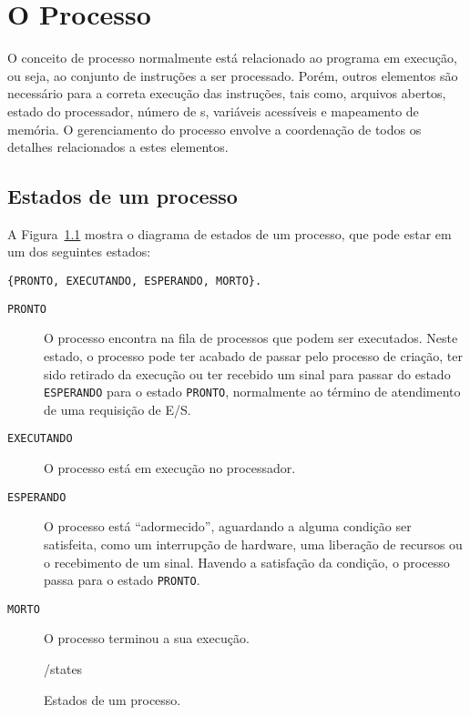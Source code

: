 
\chapter{O Processo}

O conceito de processo normalmente está relacionado ao programa em
execução, ou seja, ao conjunto de instruções a ser processado. Porém,
outros elementos são necessário para a correta execução das
instruções, tais como, arquivos abertos, estado do processador, número
de \thread{}s, variáveis acessíveis e mapeamento de memória. O
gerenciamento do processo envolve a coordenação de todos os detalhes
relacionados a estes elementos.

\section{Estados de um processo}

A Figura~\ref{fig:proc:states} mostra o diagrama de estados de um
processo, que pode estar em um dos seguintes estados:

\begin{center}
  {\tt\{PRONTO, EXECUTANDO, ESPERANDO, MORTO\}.}
\end{center}

\begin{description}
\item[\tt PRONTO] O processo encontra na fila de processos que podem
  ser executados. Neste estado, o processo pode ter acabado de passar
  pelo processo de criação, ter sido retirado da execução ou ter
  recebido um sinal para passar do estado {\tt ESPERANDO} para o
  estado {\tt PRONTO}, normalmente ao término de atendimento de uma
  requisição de E/S.
\item[\tt EXECUTANDO] O processo está em execução no processador.
\item[\tt ESPERANDO] O processo está ``adormecido'', aguardando a
  alguma condição ser satisfeita, como um interrupção de hardware, uma
  liberação de recursos ou o recebimento de um sinal. Havendo a
  satisfação da condição, o processo passa para o estado {\tt PRONTO}.
\item[\tt MORTO] O processo terminou a sua execução.
\end{description}

\begin{figure}[ht]
  \centering
   \imgdir/states
  \caption{Estados de um processo.}
  \label{fig:proc:states}
\end{figure}

